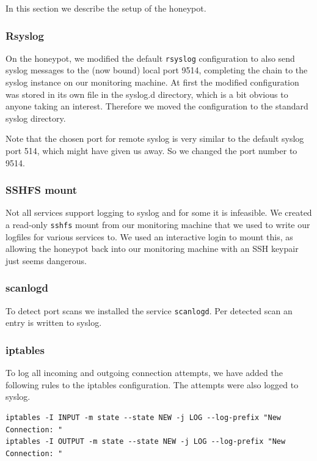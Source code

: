 \documentclass[11pt]{article}
\begin{document}
In this section we describe the setup of the honeypot.

\subsubsection{Rsyslog}
On the honeypot, we modified the default \verb|rsyslog| configuration to also send syslog messages to the (now bound) local port 9514, completing the chain to the syslog instance on our monitoring machine.
At first the modified configuration was stored in its own file in the syslog.d directory, which is a bit obvious to anyone taking an interest. Therefore we moved the configuration to the standard syslog directory. 

Note that the chosen port for remote syslog is very similar to the default syslog port 514, which might have given us away. So we changed the port number to 9514.

\subsubsection{SSHFS mount}
Not all services support logging to syslog and for some it is infeasible.
We created a read-only \verb|sshfs| mount from our monitoring machine that we used to write our logfiles for various services to.
We used an interactive login to mount this, as allowing the honeypot back into our monitoring machine with an SSH keypair just seems dangerous.

\subsubsection{scanlogd}
To detect port scans we installed the service \verb|scanlogd|.
Per detected scan an entry is written to syslog.

\subsubsection{iptables}
To log all incoming and outgoing connection attempts, we have added the following rules to the iptables configuration. The attempts were also logged to syslog.

\begin{verbatim}
iptables -I INPUT -m state --state NEW -j LOG --log-prefix "New Connection: "
iptables -I OUTPUT -m state --state NEW -j LOG --log-prefix "New Connection: "
\end{verbatim}
\end{document}
